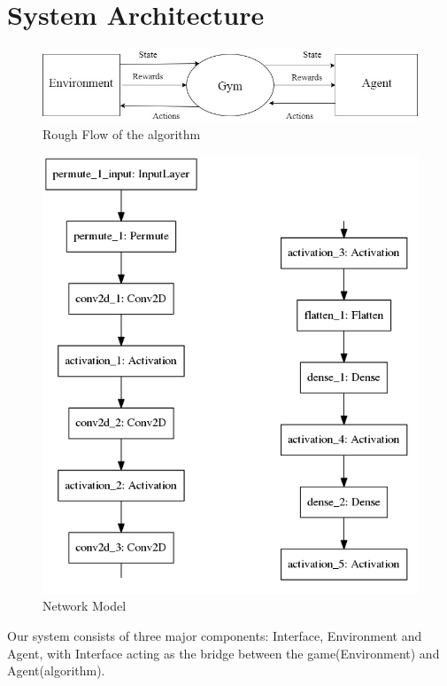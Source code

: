 \documentclass[conference,10pt]{IEEEtran}
\begin{document}
	
	\section{System Architecture}
	\begin{figure}[]
		
		\includegraphics[width=\linewidth]{flow.jpg}
		\caption{Rough Flow of the algorithm}
		\label{test}
		
	\end{figure}
	\begin{figure}[]
		
		\includegraphics[scale=0.5]{model.png}
		\caption{Network Model}
		\label{model}
		
	\end{figure}
	Our system consists of three major components: Interface, Environment and Agent, with Interface acting as the bridge between the game(Environment) and Agent(algorithm).
	
\end{document}
